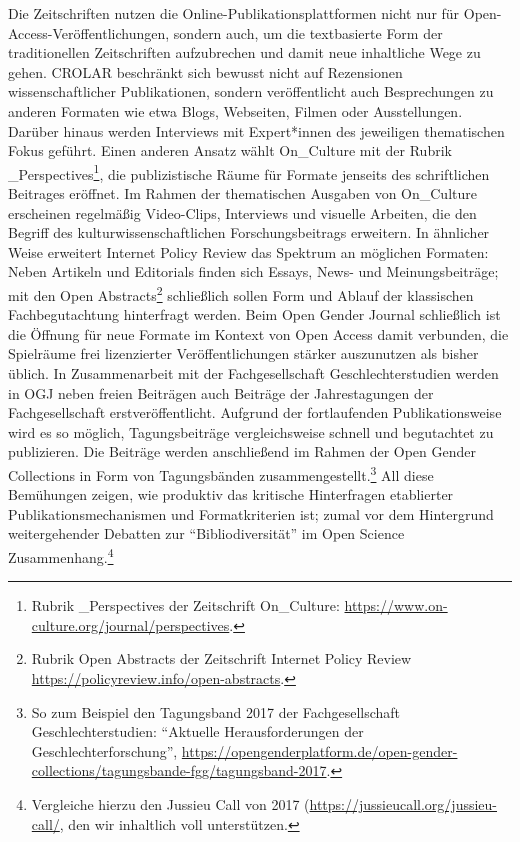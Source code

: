\documentclass[a4paper,
fontsize=11pt,
oneside,
numbers=noperiodatend,
parskip=half-,
bibliography=totoc,
final
]{scrartcl}
\begin{document}
Die Zeitschriften nutzen die Online-Publikationsplattformen nicht nur
für Open-Access-Ver\-öf\-fent\-lichungen, sondern auch, um die textbasierte
Form der traditionellen Zeitschriften aufzubrechen und damit neue
inhaltliche Wege zu gehen. CROLAR beschränkt sich bewusst nicht auf
Rezensionen wissenschaftlicher Publikationen, sondern veröffentlicht
auch Besprechungen zu anderen Formaten wie etwa Blogs, Webseiten, Filmen
oder Ausstellungen. Darüber hinaus werden Interviews mit Expert*innen
des jeweiligen thematischen Fokus geführt. Einen anderen Ansatz wählt
On\_Culture mit der Rubrik \_Perspectives\footnote{Rubrik \_Perspectives
  der Zeitschrift On\_Culture:
  \url{https://www.on-culture.org/journal/perspectives}.}, die
publizistische Räume für Formate jenseits des schriftlichen Beitrages
eröffnet. Im Rahmen der thematischen Ausgaben von On\_Culture erscheinen
regelmäßig Video-Clips, Interviews und visuelle Arbeiten, die den
Begriff des kulturwissenschaftlichen Forschungsbeitrags erweitern. In
ähnlicher Weise erweitert Internet Policy Review das Spektrum an
möglichen Formaten: Neben Artikeln und Editorials finden sich Essays,
News- und Meinungsbeiträge; mit den Open Abstracts\footnote{Rubrik Open
  Abstracts der Zeitschrift Internet Policy Review
  \url{https://policyreview.info/open-abstracts}.} schließlich sollen
Form und Ablauf der klassischen Fachbegutachtung hinterfragt werden.
Beim Open Gender Journal schließlich ist die Öffnung für neue Formate im
Kontext von Open Access damit verbunden, die Spielräume frei
lizenzierter Veröffentlichungen stärker auszunutzen als bisher üblich.
In Zusammenarbeit mit der Fachgesellschaft Geschlechterstudien werden in
OGJ neben freien Beiträgen auch Beiträge der Jahrestagungen der
Fachgesellschaft erstveröffentlicht. Aufgrund der fortlaufenden
Publikationsweise wird es so möglich, Tagungsbeiträge vergleichsweise
schnell und begutachtet zu publizieren. Die Beiträge werden anschließend
im Rahmen der Open Gender Collections in Form von Tagungsbänden
zusammengestellt.\footnote{So zum Beispiel den Tagungsband 2017 der
  Fachgesellschaft Geschlechterstudien: \enquote{Aktuelle
  Herausforderungen der Geschlechterforschung},
  \url{https://opengenderplatform.de/open-gender-collections/tagungsbande-fgg/tagungsband-2017}.}
All diese Bemühungen zeigen, wie produktiv das kritische Hinterfragen
etablierter Publikationsmechanismen und Formatkriterien ist; zumal vor
dem Hintergrund weitergehender Debatten zur \enquote{Bibliodiversität}
im Open Science Zusammenhang.\footnote{Vergleiche hierzu den Jussieu
  Call von 2017 (\url{https://jussieucall.org/jussieu-call/}, den wir
  inhaltlich voll unterstützen.}
\end{document}
